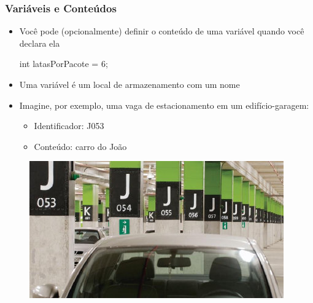 \documentclass[xcolor={dvipsnames,table},aspectratio=169]{beamer}
\begin{document}
\begin{frame}[fragile]\frametitle{Variáveis e Conteúdos}
\begin{itemize}
	\item Você pode (opcionalmente) definir o conteúdo de uma variável quando você declara ela
\begin{javacode}
int latasPorPacote = 6;
\end{javacode}
	\item Uma variável é um local de armazenamento com um nome
	\item Imagine, por exemplo, uma vaga de estacionamento em um edifício-garagem:
	\begin{itemize}
		\item Identificador: J053
		\item Conteúdo: carro do João
	\end{itemize}
\end{itemize}
\begin{figure}[h]
	\includegraphics[height=0.3\paperheight,center]{pucrs-ep-fprog-unidade_02-tipos_de_dados_fundamentais-laminas-estacionamento.jpg}
\end{figure}
\end{frame}
\end{document}
